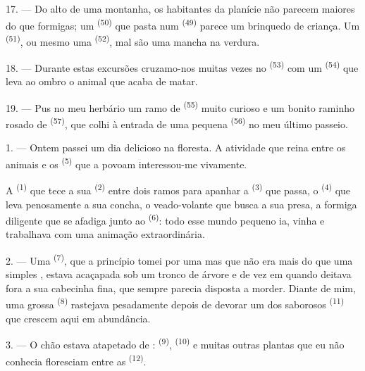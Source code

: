 17. --- Do alto de uma montanha, os habitantes da planície não parecem
maiores do que formigas; um  \textsuperscript{(50)} que
pasta num  \textsuperscript{(49)} parece um brinquedo de criança. Um
 \textsuperscript{(51)}, ou mesmo uma 
\textsuperscript{(52)}, mal são uma mancha na verdura.

18. --- Durante estas excursões cruzamo-nos muitas vezes no
 \textsuperscript{(53)} com um 
\textsuperscript{(54)} que leva ao ombro o animal que acaba de matar.

19. --- Pus no meu herbário um ramo de  \textsuperscript{(55)} muito
curioso e um bonito raminho rosado de  \textsuperscript{(57)}, que
colhi à entrada de uma pequena  \textsuperscript{(56)} no meu último
passeio.

\VUsaut{3.0mm}
\VUsaut{3.0mm}

\VUsaut{3.0mm}

1. --- Ontem passei um dia delicioso na floresta. A atividade que reina
entre os animais e os  \textsuperscript{(5)} que a povoam
interessou-me vivamente.

A  \textsuperscript{(1)} que tece a sua 
\textsuperscript{(2)} entre dois ramos para apanhar a 
\textsuperscript{(3)} que passa, o  \textsuperscript{(4)} que leva
penosamente a sua concha, o veado-volante que busca a sua presa, a
formiga diligente que se afadiga junto ao 
\textsuperscript{(6)}: todo esse mundo pequeno ia, vinha e trabalhava com uma
animação extraordinária.

2. --- Uma  \textsuperscript{(7)}, que a princípio tomei por uma
 mas que não era mais do que uma simples ,
estava acaçapada sob um tronco de árvore e de vez em quando deitava fora
a sua cabecinha fina, que sempre parecia disposta a morder. Diante de
mim, uma grossa  \textsuperscript{(8)} rastejava pesadamente depois
de devorar um dos saborosos  \textsuperscript{(11)}
que crescem aqui em abundância.

3. --- O chão estava atapetado de :
 \textsuperscript{(9)},  \textsuperscript{(10)} e
muitas outras plantas que eu não conhecia floresciam entre as
 \textsuperscript{(12)}.


